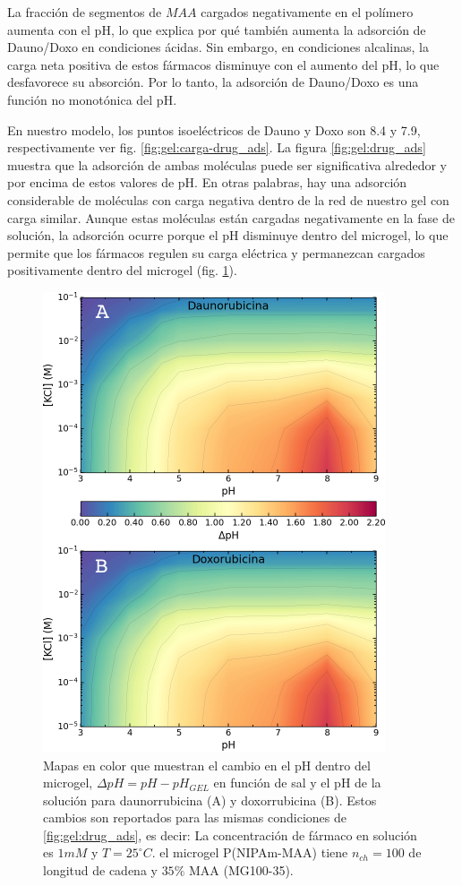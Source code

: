 La fracci\'on de segmentos de $MAA$ cargados negativamente en el pol\'imero aumenta con el pH, lo que explica por qu\'e tambi\'en aumenta la adsorci\'on de Dauno/Doxo en condiciones \'acidas. Sin embargo, en condiciones alcalinas, la carga neta positiva de estos f\'armacos disminuye con el aumento del pH, lo que desfavorece su absorci\'on. Por lo tanto, la adsorci\'on de Dauno/Doxo es una funci\'on no monot\'onica del pH.

En nuestro modelo, los puntos isoel\'ectricos de Dauno y Doxo son 8.4 y 7.9, respectivamente ver fig. \ref{fig:gel:carga-drug_ads}. La figura \ref{fig:gel:drug_ads} muestra que la adsorci\'on de ambas mol\'eculas puede ser significativa alrededor y por encima de estos valores de pH. En otras palabras, hay una adsorci\'on considerable de mol\'eculas con carga negativa dentro de la red de nuestro gel con carga similar. Aunque estas mol\'eculas est\'an cargadas negativamente en la fase de soluci\'on, la adsorci\'on ocurre porque el pH disminuye dentro del microgel, lo que permite que los f\'armacos regulen su carga el\'ectrica y permanezcan cargados positivamente dentro del microgel (fig. \ref{fig:gel:drug_pH}).


\begin{figure}[!tb]
	\centering
	\includegraphics[width=0.55\linewidth]{Figures/graph-gel/drug_pH.pdf}
	\caption{Mapas en color que muestran el cambio en el pH dentro del microgel, $\Delta pH = pH - pH_{GEL}$ en funci\'on de sal y el pH de la soluci\'on para daunorrubicina (A) y doxorrubicina (B). Estos cambios son reportados para las mismas condiciones de \ref{fig:gel:drug_ads}, es decir:
		La concentraci\'on de f\'armaco en soluci\'on es $1mM$ y $T=25 ^\circ C$.
		el microgel P(NIPAm-MAA) tiene $n_{ch}=100$ de longitud de cadena y $35\%$ MAA (MG100-35).}
	\label{fig:gel:drug_pH}
\end{figure}

